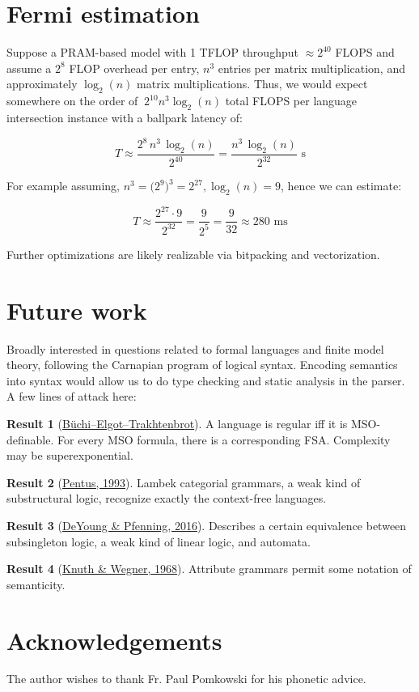 \documentclass[11pt]{article}
\theoremstyle{plain}
\theoremstyle{definition}
\newtheorem{result}{Result}
\begin{document}
\section{Fermi estimation}

Suppose a PRAM-based model with 1 TFLOP throughput \(\approx 2^{40}\) FLOPS and assume a \(2^{8}\) FLOP overhead per entry, \(n^3\) entries per matrix multiplication, and approximately \(\log_2(n)\) matrix multiplications. Thus, we would expect somewhere on the order of $~2^{10} n^3 \log_2(n)$ total FLOPS per language intersection instance with a ballpark latency of:

\[T \approx \frac{2^{8} \, n^3 \, \log_2(n)}{2^{40}} = \frac{n^3 \, \log_2(n)}{2^{32}} \text{ s}\]

\noindent For example assuming, $n^3 = \bigl(2^9\bigr)^3 = 2^{27}, \log_2(n)=9$, hence we can estimate:

\[T \approx \frac{2^{27} \cdot 9}{2^{32}} = \frac{9}{2^5} = \frac{9}{32} \approx 280 \text{ ms}\]

\noindent Further optimizations are likely realizable via bitpacking and vectorization.

\section{Future work}

Broadly interested in questions related to formal languages and finite model theory, following the Carnapian program of logical syntax. Encoding semantics into syntax would allow us to do type checking and static analysis in the parser. A few lines of attack here:

\begin{result}[\href{https://link.springer.com/chapter/10.1007/978-1-4613-8928-6_22}{B\"uchi--Elgot--Trakhtenbrot}]
  A language is regular iff it is MSO-definable. For every MSO formula, there is a corresponding FSA. Complexity may be superexponential.
\end{result}

\begin{result}[\href{https://ieeexplore.ieee.org/document/287565}{Pentus, 1993}]
  Lambek categorial grammars, a weak kind of substructural logic, recognize exactly the context-free languages.
\end{result}

\begin{result}[\href{https://www.cs.cmu.edu/~fp/papers/aplas16.pdf}{DeYoung \& Pfenning, 2016}]
  Describes a certain equivalence between subsingleton logic, a weak kind of linear logic, and automata.
\end{result}

\begin{result}[\href{https://www.dcs.warwick.ac.uk/~sk/cs325/gag.pdf}{Knuth \& Wegner, 1968}]
  Attribute grammars permit some notation of semanticity.
\end{result}

\section{Acknowledgements}

The author wishes to thank Fr. Paul Pomkowski for his phonetic advice.
\end{document}
